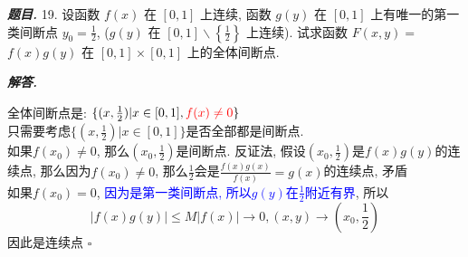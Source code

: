 \documentclass[10pt, a4paper, oneside]{ctexart}
\newenvironment{problem}{\begin{framed}\par\noindent\textbf{\textit{题目. }}}{\end{framed}\par}
\newenvironment{solution}{%
  \par\noindent\textbf{\textit{解答. }}\ignorespaces
}{%
  \hfill\ensuremath{\square}\par %
}
\begin{document}
\begin{problem}
19. 设函数 $f(x)$ 在 $[0,1]$ 上连续, 函数 $g(y)$ 在 $[0,1]$ 上有唯一的第一类间断点 $y_0=\frac{1}{2}$, ($g(y)$ 在 $[0,1] \backslash\left\{\frac{1}{2}\right\}$ 上连续). 试求函数 $F(x, y)=$ $f(x) g(y)$ 在 $[0,1] \times[0,1]$ 上的全体间断点.
\end{problem}
\begin{solution}
全体间断点是: $\{(x,\frac{1}{2})| x\in [0,1], \textcolor{red}{f(x)\neq 0} \}$\\
只需要考虑$\{(x,\frac{1}{2})| x\in [0,1]\}$是否全部都是间断点.\\
如果$f(x_0)\neq 0$, 那么$(x_0,\frac{1}{2})$是间断点. 反证法, 假设$(x_0,\frac{1}{2})$是$f(x)g(y)$的连续点, 那么因为$f(x_0)\neq 0$, 那么$\frac{1}{2}$会是$\frac{f(x)g(x)}{f(x)}=g(x)$的连续点, 矛盾\\
如果$f(x_0)=0$, \textcolor{blue}{因为是第一类间断点, 所以$g(y)$在$\frac{1}{2}$附近有界}, 所以
$$ |f(x)g(y)|\leq M|f(x)|\to 0, (x,y)\to (x_0,\frac{1}{2})$$
因此是连续点
\end{solution}
\end{document}
